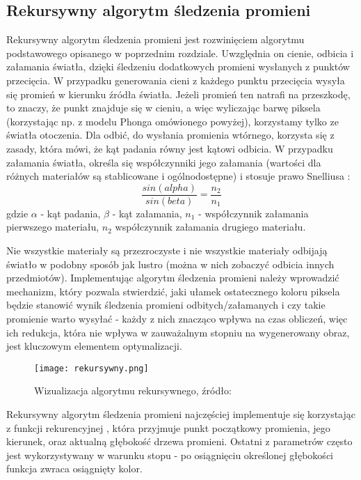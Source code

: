  
\subsection{Rekursywny algorytm śledzenia promieni}

Rekursywny algorytm śledzenia promieni \cite{foley95} jest rozwinięciem algorytmu podstawowego opisanego w poprzednim rozdziale. Uwzględnia on cienie, odbicia i załamania światła, dzięki śledzeniu dodatkowych promieni wysłanych z punktów przecięcia. W przypadku generowania cieni z każdego punktu przecięcia wysyła się promień w kierunku źródła światła. Jeżeli promień ten natrafi na przeszkodę, to znaczy, że punkt znajduje się w cieniu, a więc wyliczając barwę piksela (korzystając np. z modelu Phonga omówionego powyżej), korzystamy tylko ze światła otoczenia. Dla odbić, do wysłania promienia wtórnego, korzysta się z zasady, która mówi, że kąt padania równy jest kątowi odbicia. W przypadku załamania światła, określa się współczynniki jego załamania (wartości dla różnych materiałów są stablicowane i ogólnodostępne) i stosuje prawo Snelliusa \cite{snellius}:
$$\frac{sin(alpha)}{sin(beta)} = \frac{n_2}{n_1}$$
gdzie $\alpha$ - kąt padania, $\beta$ - kąt załamania, $n_1$ - współczynnik załamania pierwszego materiału, $n_2$ współczynnik załamania drugiego materiału.

Nie wszystkie materiały są przezroczyste i nie wszystkie materiały odbijają światło w podobny sposób jak lustro (można w nich zobaczyć odbicia innych przedmiotów). Implementując algorytm śledzenia promieni należy wprowadzić mechanizm, który pozwala stwierdzić, jaki ułamek ostatecznego koloru piksela będzie stanowić wynik śledzenia promieni odbitych/załamanych i czy takie promienie warto wysyłać - każdy z nich znacząco wpływa na czas obliczeń, więc ich redukcja, która nie wpływa w zauważalnym stopniu na wygenerowany obraz, jest kluczowym elementem optymalizacji.

\begin{figure}[H]
\centering
  \texttt{[image: rekursywny.png]}
  \caption{Wizualizacja algorytmu rekursywnego, źródło: \cite{scratch}}
\end{figure}

Rekursywny algorytm śledzenia promieni najczęściej implementuje się korzystając z funkcji rekurencyjnej \cite{suffern2007}, która przyjmuje punkt początkowy promienia, jego kierunek, oraz aktualną głębokość drzewa promieni. Ostatni z parametrów często jest wykorzystywany w warunku stopu - po osiągnięciu określonej głębokości funkcja zwraca osiągnięty kolor.


